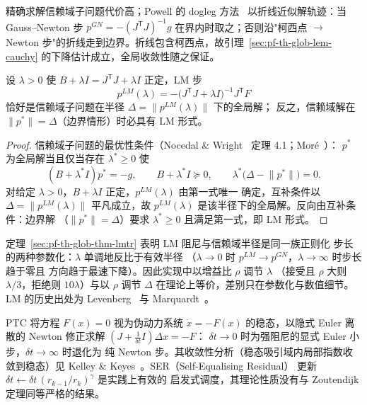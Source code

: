 \begin{remark}\label{sec:pf-th-glob-rem-dogleg}
精确求解信赖域子问题代价高；Powell 的 dogleg
方法~\cite{pfglob-powell,pfglob-ds} 以折线近似解轨迹：当 Gauss--Newton 步
$p^{GN}=-(J^{\mathsf T}J)^{-1}g$ 在界内时取之；否则沿"柯西点 $\to$ Newton
步"的折线走到边界。折线包含柯西点，故引理~\ref{sec:pf-th-glob-lem-cauchy}
的下降估计成立，全局收敛性随之保证。
\end{remark}

\begin{theorem}\label{sec:pf-th-glob-thm-lmtr}
设 $\lambda>0$ 使 $B+\lambda I=J^{\mathsf T}J+\lambda I$ 正定，LM 步
\begin{equation}
p^{LM}(\lambda)=-\bigl(J^{\mathsf T}J+\lambda I\bigr)^{-1}J^{\mathsf T}F
\end{equation}
恰好是信赖域子问题在半径 $\Delta=\lVert p^{LM}(\lambda)\rVert$ 下的全局解；
反之，信赖域解在 $\lVert p^*\rVert=\Delta$（边界情形）时必具有 LM 形式。
\end{theorem}

\begin{proof}
信赖域子问题的最优性条件（Nocedal \&
Wright~\cite{pfglob-nw} 定理 4.1；Moré~\cite{pfglob-more}）：
$p^*$ 为全局解当且仅当存在 $\lambda^*\ge0$ 使
\begin{equation}
(B+\lambda^* I)p^*=-g,\qquad B+\lambda^* I\succeq0,\qquad
\lambda^*\bigl(\Delta-\lVert p^*\rVert\bigr)=0.
\end{equation}
对给定 $\lambda>0$，$B+\lambda I$ 正定，$p^{LM}(\lambda)$ 由第一式唯一
确定，互补条件以 $\Delta=\lVert p^{LM}(\lambda)\rVert$ 平凡成立，故
$p^{LM}(\lambda)$ 是该半径下的全局解。反向由互补条件：边界解
（$\lVert p^*\rVert=\Delta$）要求 $\lambda^*\ge0$ 且满足第一式，即
LM 形式。
\end{proof}

\begin{remark}\label{sec:pf-th-glob-rem-lmtr}
定理~\ref{sec:pf-th-glob-thm-lmtr} 表明 LM 阻尼与信赖域半径是同一族正则化
步长的两种参数化：$\lambda$ 单调地反比于有效半径
（$\lambda\to0$ 时 $p^{LM}\to p^{GN}$，$\lambda\to\infty$ 时步长趋于零且
方向趋于最速下降）。因此实现中以增益比 $\rho$ 调节 $\lambda$
（接受且 $\rho$ 大则 $\lambda/3$，拒绝则 $10\lambda$）与以 $\rho$ 调节
$\Delta$ 在理论上等价，差别只在参数化与数值细节。LM 的历史出处为
Levenberg~\cite{pfglob-levenberg} 与 Marquardt~\cite{pfglob-marquardt}。
\end{remark}

\begin{remark}\label{sec:pf-th-glob-rem-ptc}
PTC 将方程 $F(x)=0$ 视为伪动力系统 $\dot x=-F(x)$ 的稳态，以隐式 Euler
离散的 Newton 修正求解 $(J+\tfrac1{\delta t}I)\Delta x=-F$：
$\delta t\to0$ 时为强阻尼的显式 Euler 小步，$\delta t\to\infty$ 时退化为
纯 Newton 步。其收敛性分析（稳态吸引域内局部指数收敛到稳态）见
Kelley \& Keyes~\cite{pfglob-kelley-keyes}。SER（Self-Equalising Residual）
更新 $\delta t\leftarrow\delta t\,(r_{k-1}/r_k)^\gamma$ 是实践上有效的
启发式调度，其理论性质没有与 Zoutendijk 定理同等严格的结果。
\end{remark}

